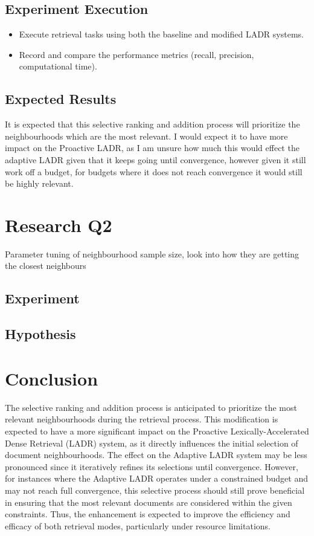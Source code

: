 \documentclass[sigconf,authorversion,nonacm]{acmart}
\begin{document}
\subsection{Experiment Execution}

\begin{itemize}
	\item Execute retrieval tasks using both the baseline and modified LADR systems.
	\item Record and compare the performance metrics (recall, precision, computational time).
\end{itemize}

\subsection{Expected Results}

It is expected that this selective ranking and addition process will prioritize the neighbourhoods
which are the most relevant. I would expect it to have more impact on the Proactive LADR, as I am
unsure how much this would effect the adaptive LADR given that it keeps going until convergence,
however given it still work off a budget, for budgets where it does not reach convergence it would
still be highly relevant.

\section{Research Q2}

Parameter tuning of neighbourhood sample size, look into how they are getting the closest neighbours

\subsection{Experiment}

\subsection{Hypothesis}
\section{Conclusion}

The selective ranking and addition process is anticipated to prioritize the most relevant
neighbourhoods during the retrieval process. This modification is expected to have a more significant
impact on the Proactive Lexically-Accelerated Dense Retrieval (LADR) system, as it directly
influences the initial selection of document neighbourhoods. The effect on the Adaptive LADR system
may be less pronounced since it iteratively refines its selections until convergence. However, for
instances where the Adaptive LADR operates under a constrained budget and may not reach full
convergence, this selective process should still prove beneficial in ensuring that the most relevant
documents are considered within the given constraints. Thus, the enhancement is expected to improve
the efficiency and efficacy of both retrieval modes, particularly under resource limitations.

\section*{}


\end{document}
